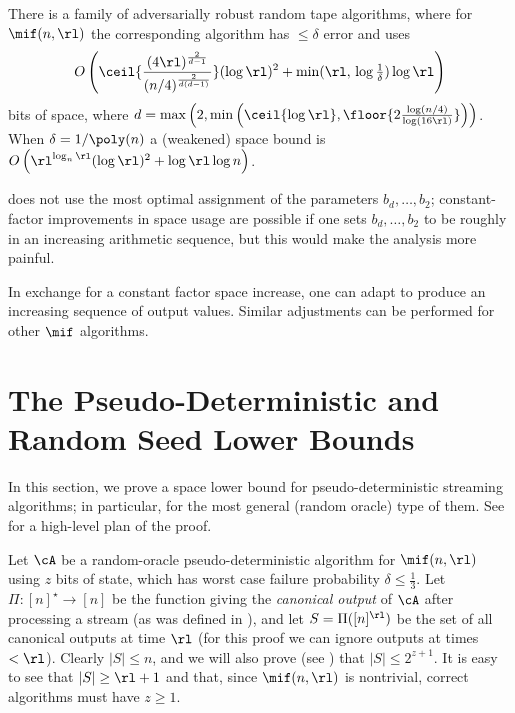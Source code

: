 \begin{itemize}
\begin{itemize}
\begin{theorem} %
\label{thm:rt-ub-intro}
  There is a family of adversarially robust random tape algorithms, where
  for $\mif(n,\rl)$ the corresponding algorithm has $\le \delta$ error and uses
  \begin{align*}
    O\left(\ceil{ 
    \frac{(4 \rl)^{\frac{2}{d - 1}}}{(n/4)^{\frac{2}{d(d-1)}}}
    } (\log \rl)^2 + \min(\rl,\, \log \tfrac{1}{\delta}) \log \rl \right)
  \end{align*}
  bits of space, where $d = \max\left(2, \min\left(\ceil{\log \rl}, \floor{2 \frac{\log(n/4)}{\log(16\rl)}}\right)\right)$. When $\delta = 1/\poly(n)$ a (weakened) space bound is $O\left(\rl^{\log_n \rl} (\log \rl)^2 + \log \rl\log n\right)$.
\end{theorem}

\begin{remark}
   does not use the most optimal assignment of the parameters $b_d,\ldots,b_2$; constant-factor improvements in space usage are possible if one sets $b_d,\ldots,b_2$ to be roughly in an increasing arithmetic sequence, but this would make the analysis more painful.
\end{remark}

\begin{remark}
  In exchange for a constant factor space increase, one can adapt  to produce an increasing sequence of output values. Similar adjustments can be performed for other $\mif$ algorithms.
\end{remark}



\section{The Pseudo-Deterministic and Random Seed Lower Bounds}\label{sec:pd-lb}

In this section, we prove a space lower bound for pseudo-deterministic
streaming algorithms; in particular, for the most general (random oracle) type
of them. See  for a high-level plan of the proof.

Let $\cA$ be a random-oracle pseudo-deterministic algorithm for $\mif(n, \rl)$
using $z$ bits of state, which has worst case failure probability $\delta \le
\frac{1}{3}$. Let $\Pi \colon [n]^\star \to [n]$ be the function giving the
{\em canonical output} of $\cA$ after processing a stream (as was defined in
), and let $S = \Pi([n]^\rl)$ be the set of all canonical
outputs at time $\rl$ (for this proof we can ignore outputs at times $<\rl$).
Clearly $|S| \le n$, and we will also prove (see ) that
$|S| \le 2^{z+1}$. It is easy to see that $|S| \ge \rl + 1$ and that, since
$\mif(n,\rl)$ is nontrivial, correct algorithms must have $z \ge 1$.


\end{itemize}
\end{itemize}
